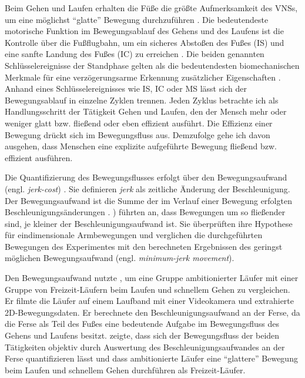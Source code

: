 Beim Gehen und Laufen erhalten die Füße die größte Aufmerksamkeit des \ac{VNS}s, um eine möglichst "`glatte"' Bewegung durchzuführen \citep[vgl.][S.~193]{Brooks1986}. Die bedeutendeste motorische Funktion im Bewegungsablauf des Gehens und des Laufens ist die Kontrolle über die Fußflugbahn, um ein sicheres Abstoßen des Fußes (\ac{IS}) und eine sanfte Landung des Fußes (\ac{IC}) zu erreichen \citep[vgl.][S.~197]{Winter1989}. Die beiden genannten Schlüsselereignisse der Standphase gelten als die bedeutendesten biomechanischen Merkmale für eine verzögerungsarme Erkennung zusätzlicher Eigenschaften \citep[vgl.][]{Aminian2002, Lee2011}. Anhand eines Schlüsselereignisses wie \ac{IS}, \ac{IC} oder \ac{MS} lässt sich der Bewegungsablauf in einzelne Zyklen trennen. Jeden Zyklus betrachte ich als Handlungsschritt der Tätigkeit Gehen und Laufen, den der Mensch mehr oder weniger glatt bzw. fließend oder eben effizient ausführt. Die Effizienz einer Bewegung drückt sich im Bewegungsfluss aus. Demzufolge gehe ich davon ausgehen, dass Menschen eine explizite aufgeführte Bewegung fließend bzw. effizient ausführen.

Die Quantifizierung des Bewegungsflusses erfolgt über den Bewegungsaufwand (engl. \emph{jerk-cost}) \citep[vgl.][]{Nelson1983, Hogan1984, Flash1985}. Sie definieren \emph{jerk} als zeitliche Änderung der Beschleunigung. Der Bewegungsaufwand ist die Summe der im Verlauf einer Bewegung erfolgten Beschleunigungsänderungen \citep[vgl.][]{Schneider1990}. \citet[][S.~1698]{Flash1985}) führten an, dass Bewegungen um so fließender sind, je kleiner der Beschleunigungsaufwand ist. Sie überprüften ihre Hypothese für eindimensionale Armbewegungen und verglichen die durchgeführten Bewegungen des Experimentes mit den berechneten Ergebnissen des geringst möglichen Bewegungsaufwand (engl.\emph{ minimum-jerk movement}).

Den Bewegungsaufwand nutzte \citet[][]{Hreljac2000}, um eine Gruppe ambitionierter Läufer mit einer Gruppe von Freizeit-Läufern beim Laufen und schnellem Gehen zu vergleichen. Er filmte die Läufer auf einem Laufband mit einer Videokamera und extrahierte 2D-Bewegungsdaten. Er berechnete den Beschleunigungsaufwand an der Ferse, da die Ferse als Teil des Fußes eine bedeutende Aufgabe im Bewegungsfluss des Gehens und Laufens besitzt. \citet[][]{Hreljac2000} zeigte, dass sich der Bewegungsfluss der beiden Tätigkeiten objektiv durch Auswertung des Beschleunigungsaufwandes an der Ferse quantifizieren lässt und dass ambitionierte Läufer eine "`glattere"' Bewegung beim Laufen und schnellem Gehen durchführen als Freizeit-Läufer.

